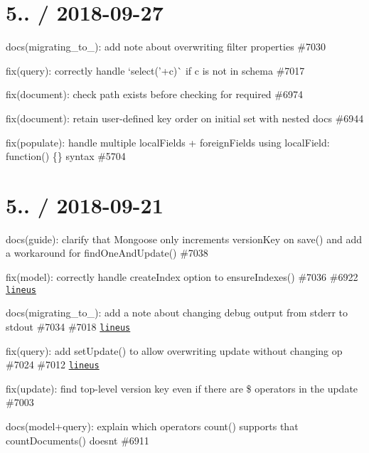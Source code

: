 \section*{5.. / 2018-\/09-\/27 }


\begin{DoxyItemize}
\item docs(migrating\+\_\+to\+\_)\+: add note about overwriting filter properties \#7030
\item fix(query)\+: correctly handle `select('+c\textquotesingle{})\`{} if c is not in schema \#7017
\item fix(document)\+: check path exists before checking for required \#6974
\item fix(document)\+: retain user-\/defined key order on initial set with nested docs \#6944
\item fix(populate)\+: handle multiple local\+Fields + foreign\+Fields using {\ttfamily local\+Field\+: function() \{\}} syntax \#5704
\end{DoxyItemize}

\section*{5.. / 2018-\/09-\/21 }


\begin{DoxyItemize}
\item docs(guide)\+: clarify that Mongoose only increments version\+Key on {\ttfamily save()} and add a workaround for {\ttfamily find\+One\+And\+Update()} \#7038
\item fix(model)\+: correctly handle {\ttfamily create\+Index} option to {\ttfamily ensure\+Indexes()} \#7036 \#6922 \href{https://github.com/lineus}{\tt lineus}
\item docs(migrating\+\_\+to\+\_)\+: add a note about changing debug output from stderr to stdout \#7034 \#7018 \href{https://github.com/lineus}{\tt lineus}
\item fix(query)\+: add {\ttfamily set\+Update()} to allow overwriting update without changing op \#7024 \#7012 \href{https://github.com/lineus}{\tt lineus}
\item fix(update)\+: find top-\/level version key even if there are {\ttfamily \$} operators in the update \#7003
\item docs(model+query)\+: explain which operators {\ttfamily count()} supports that {\ttfamily count\+Documents()} doesn\textquotesingle{}t \#6911
\end{DoxyItemize}

